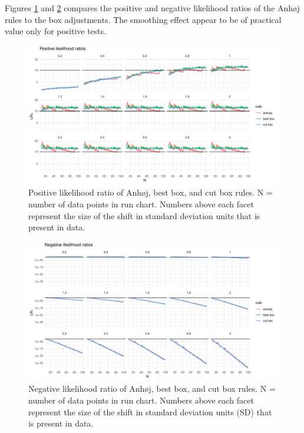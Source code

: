 Figures \ref{figure:lrpos} and \ref{figure:lrneg} compares the positive
and negative likelihood ratios of the Anhøj rules to the box
adjustments. The smoothing effect appear to be of practical value only
for positive tests.

\begin{figure}[htbp]
  \centering
  \includegraphics[width=\textwidth]{fig_lrpos.pdf}
  \caption{Positive likelihood ratio of Anhøj, best box, and cut box rules.
           N = number of data points in run chart.
           Numbers above each facet represent the size of the shift in standard
           deviation units that is present in data.}
  \label{figure:lrpos}
\end{figure}

\begin{figure}[htbp]
  \centering
  \includegraphics[width=\textwidth]{fig_lrneg.pdf}
  \caption{Negative likelihood ratio of Anhøj, best box, and cut box rules.
           N = number of data points in run chart.
           Numbers above each facet represent the size of the shift in standard
           deviation units (SD) that is present in data.}
  \label{figure:lrneg}
\end{figure}

